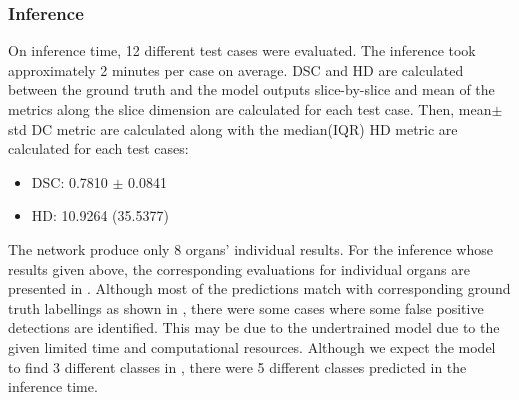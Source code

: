 \documentclass{IEEEtran}
\begin{document}
\subsubsection{Inference}
On inference time, 12 different test cases were evaluated. The inference took approximately 2 minutes per case on average. DSC and HD are calculated between the ground truth and the model outputs slice-by-slice and mean of the metrics along the slice dimension are calculated for each test case. Then, mean$\pm$std DC metric are calculated along with the median(IQR) HD metric are calculated for each test cases:

\begin{itemize}
    \item DSC: 0.7810 $\pm$ 0.0841
    \item HD: 10.9264 (35.5377)
\end{itemize}

The network produce only 8 organs' individual results. For the inference whose results given above, the corresponding evaluations for individual organs are presented in . Although most of the predictions match with corresponding ground truth labellings as shown in , there were some cases where some false positive detections are identified. This may be due to the undertrained model due to the given limited time and computational resources. Although we expect the model to find 3 different classes in , there were 5 different classes predicted in the inference time. 

\begin{table}[h]
\caption{\label{tab:organs}Segmentation performance on individual organs utilized in the study}
\end{table}
\end{document}
